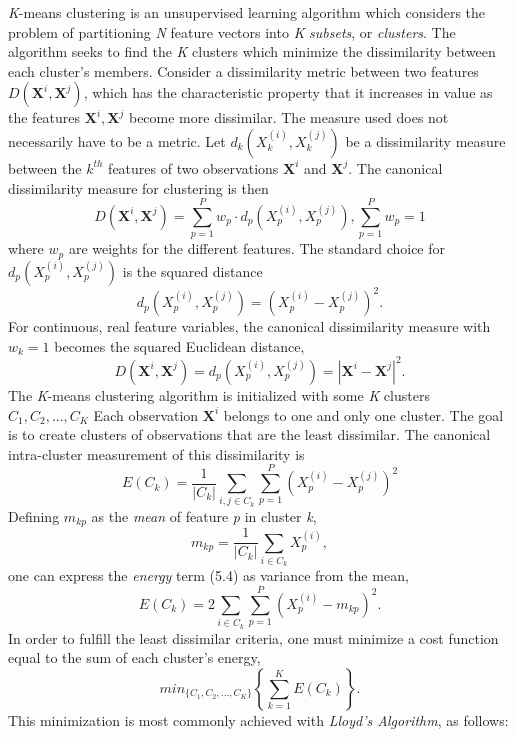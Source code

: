 \documentclass[twocolumn, english]{revtex4-2}
\numberwithin{equation}{section}
\begin{document}
\textit{K}-means clustering is an unsupervised learning algorithm which considers the problem of partitioning \textit{N} feature vectors into \textit{K} \textit{subsets}, or \textit{clusters}. The algorithm seeks to find the \textit{K} clusters which minimize the dissimilarity between each cluster's members. Consider a dissimilarity metric between two features $\textit{D}(\textbf{X}^{i}, \textbf{X}^{j})$, which has the characteristic property that it increases in value as the features $\textbf{X}^{i}, \textbf{X}^{j}$ become more dissimilar. The measure used does not necessarily have to be a metric. Let \textit{$d_{k}(X_{k}^{(i)}, X_{k}^{(j)})$} be a dissimilarity measure between the \textit{$k^{th}$} features of two observations $\textbf{X}^{i}$ and $\textbf{X}^{j}$. The canonical dissimilarity measure for clustering is then \begin{equation}\textit{D}(\textbf{X}^{i}, \textbf{X}^{j})=\sum_{p=1}^\textit{P} \textit{w}_{p} \cdot \textit{$d_{p}(X_{p}^{(i)}, X_{p}^{(j)})$}, \sum_{p=1}^\textit{P} \textit{w}_{p} = 1\end{equation} where $\textit{w}_{p}$ are weights for the different features. The standard choice for \textit{$d_{p}(X_{p}^{(i)}, X_{p}^{(j)})$} is the squared distance  \begin{equation}d_{p}(X_{p}^{(i)}, X_{p}^{(j)}) = (X_{p}^{(i)} - X_{p}^{(j)})^2.\end{equation} For continuous, real feature variables, the canonical dissimilarity measure with $\textit{w}_{k} = 1$ becomes the squared Euclidean distance, \begin{equation}\textit{D}(\textbf{X}^{i}, \textbf{X}^{j})=d_{p}(X_{p}^{(i)}, X_{p}^{(j)})=|\textbf{X}^{i}-\textbf{X}^{j}|^2.\end{equation} The \textit{K}-means clustering algorithm is initialized with some \textit{K} clusters \textit{$C_{1}, C_{2}, ..., C_{K}$} Each observation $\textbf{X}^{i}$ belongs to one and only one cluster. The goal is to create clusters of observations that are the least dissimilar. The canonical intra-cluster measurement of this dissimilarity is \begin{equation}E(\textit{C}_{k}) = \frac{1}{|C_{k}|}\sum_{i, j \in{C_{k}}}\sum_{p=1}^{\textit{P}}(X_{p}^{(i)} - X_{p}^{(j)})^2\end{equation} Defining \textit{$m_{kp}$} as the \textit{mean} of feature \textit{p} in cluster \textit{k}, \begin{equation}\textit{$m_{kp}$}=\frac{1}{|C_{k}|}\sum_{i\in{C_{k}}}X_{p}^{(i)},\end{equation} one can express the \textit{energy} term (5.4) as variance from the mean, \begin{equation}E(\textit{C}_{k}) = 2\sum_{i\in{C_{k}}}\sum_{p=1}^{\textit{P}}(X_{p}^{(i)}-m_{kp})^2.\end{equation} In order to fulfill the least dissimilar criteria, one must minimize a cost function equal to the sum of each cluster's energy,\begin{equation}min_{\{C_{1}, C_{2}, ..., C_{K}\}}\left\{\sum_{k=1}^{K}E(C_{k})\right\}.\end{equation} This minimization is most commonly achieved with \textit{Lloyd's Algorithm}, as follows: \newline
\end{document}
